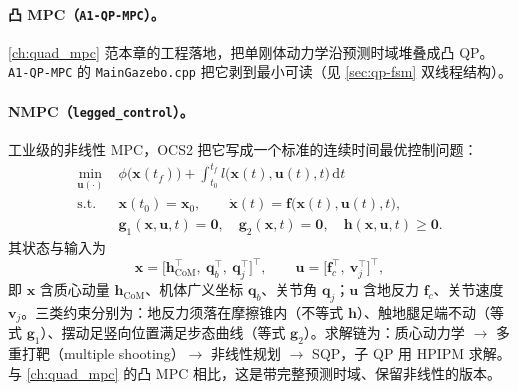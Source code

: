 \paragraph{凸 MPC（\texttt{A1-QP-MPC}）。}
\cref{ch:quad_mpc} 范本章的工程落地，把单刚体动力学沿预测时域堆叠成凸 QP。\texttt{A1-QP-MPC} 的 \texttt{MainGazebo.\allowbreak cpp} 把它剥到最小可读（见 \cref{sec:qp-fsm} 双线程结构）。

\paragraph{NMPC（\texttt{legged\_control}）。}
工业级的非线性 MPC，OCS2 把它写成一个标准的连续时间最优控制问题\cite{sleiman2021unified}：
\begin{equation}
\begin{aligned}
  \min_{\boldsymbol{u}(\cdot)}\;& \phi\big(\boldsymbol{x}(t_f)\big)+\int_{t_0}^{t_f} l\big(\boldsymbol{x}(t),\boldsymbol{u}(t),t\big)\,\mathrm{d}t\\
  \text{s.t.}\;& \boldsymbol{x}(t_0)=\boldsymbol{x}_0,\qquad \dot{\boldsymbol{x}}(t)=\boldsymbol{f}\big(\boldsymbol{x}(t),\boldsymbol{u}(t),t\big),\\
  & \boldsymbol{g}_1(\boldsymbol{x},\boldsymbol{u},t)=\boldsymbol{0},\quad \boldsymbol{g}_2(\boldsymbol{x},t)=\boldsymbol{0},\quad \boldsymbol{h}(\boldsymbol{x},\boldsymbol{u},t)\ge\boldsymbol{0}.
\end{aligned}
\label{eq:qp-nmpc}
\end{equation}
其状态与输入为\cite{sleiman2021unified}
\begin{equation}
  \boldsymbol{x}=\big[\boldsymbol{h}_{\mathrm{CoM}}^\top,\ \boldsymbol{q}_b^\top,\ \boldsymbol{q}_j^\top\big]^\top,
  \qquad
  \boldsymbol{u}=\big[\boldsymbol{f}_c^\top,\ \boldsymbol{v}_j^\top\big]^\top,
  \label{eq:qp-nmpc-state}
\end{equation}
即 $\boldsymbol{x}$ 含质心动量 $\boldsymbol{h}_{\mathrm{CoM}}$、机体广义坐标 $\boldsymbol{q}_b$、关节角 $\boldsymbol{q}_j$；$\boldsymbol{u}$ 含地反力 $\boldsymbol{f}_c$、关节速度 $\boldsymbol{v}_j$。三类约束分别为：地反力须落在摩擦锥内（不等式 $\boldsymbol{h}$）、触地腿足端不动（等式 $\boldsymbol{g}_1$）、摆动足竖向位置满足步态曲线（等式 $\boldsymbol{g}_2$）。求解链为：质心动力学 $\to$ 多重打靶（multiple shooting）$\to$ 非线性规划 $\to$ SQP，子 QP 用 HPIPM 求解\cite{sleiman2021unified}。与 \cref{ch:quad_mpc} 的凸 MPC 相比，这是带完整预测时域、保留非线性的版本。


